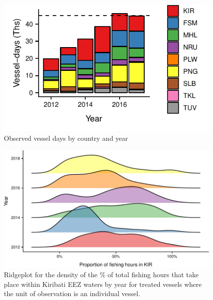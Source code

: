 \documentclass[9p,twocolumn,twoside,lineno]{pnas-new}
\begin{document}
\clearpage

\begin{figure}
\centering
	\includegraphics{img/all_PS_VDS_cty_year.pdf}
	\caption{\label{fig:all_PS_VDS_cty_year}Observed vessel days by country and year}
\end{figure}

\clearpage

\begin{figure}
\centering
	\includegraphics{img/hist_kir_fishing.pdf}
	\caption{\label{fig:hist_kir_fishing}Ridgeplot for the density of the \% of total fishing hours that take place within Kiribati EEZ waters by year for treated vessels where the unit of observation is an individual vessel.}
\end{figure}

\clearpage
\end{document}
